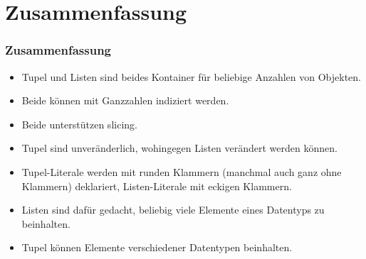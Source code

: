 \documentclass[aspectratio=169,mathserif,notheorems]{beamer}%
\begin{document}
\section{Zusammenfassung}%
%
\begin{frame}%
\frametitle{Zusammenfassung}%
\begin{itemize}%
\item Tupel und Listen sind beides Kontainer für beliebige Anzahlen von Objekten.%
%
\item<2-> Beide können mit Ganzzahlen indiziert werden.%
%
\item<3-> Beide unterstützen slicing.%
%
\item<4-> Tupel sind unveränderlich, wohingegen Listen verändert werden können.%
%
\item<5-> Tupel-Literale werden mit runden Klammern (manchmal auch ganz ohne Klammern) deklariert, Listen-Literale mit eckigen Klammern.%
%
\item<6-> Listen sind dafür gedacht, beliebig viele Elemente eines Datentyps zu beinhalten.%
%
\item<7-> Tupel können Elemente verschiedener Datentypen beinhalten.%
%
\end{itemize}%
\end{frame}%
%
\endPresentation%
\end{document}
